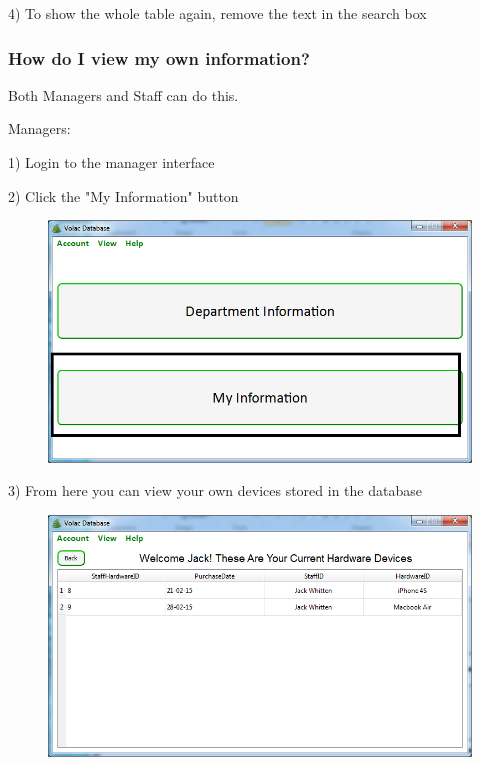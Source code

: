 4) To show the whole table again, remove the text in the search box

\subsubsection{How do I view my own information?}\label{owninfo}

Both Managers and Staff can do this.

Managers:

1) Login to the manager interface

2) Click the "My Information" button 

\begin{figure}[H]
    \includegraphics[width=\textwidth]{./Manual/Images/myinfo.png}
\end{figure}

3) From here you can view your own devices stored in the database

\begin{figure}[H]
    \includegraphics[width=\textwidth]{./Manual/Images/myinfo2.png}
\end{figure}

